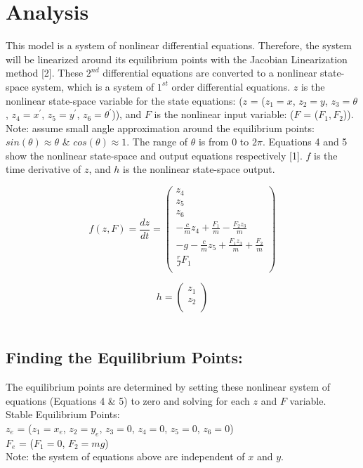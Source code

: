 \documentclass[conference]{IEEEtran}
\begin{document}
\newpage
\section{Analysis}
This model is a system of nonlinear differential equations. Therefore, the system will be linearized around its equilibrium points with the Jacobian Linearization method [2]. These $2^{nd}$ differential equations are converted to a nonlinear state-space system, which is a system of $1^{st}$  order differential equations. $z$ is the nonlinear state-space variable for the state equations: ($z$ = ($z_1 = x$, $z_2 = y$, $z_3 = \theta$, $z_4 = x^\prime$, $z_5 = y^\prime$, $z_6 = \theta^\prime$)), and $F$ is the nonlinear input variable: ($F$ = ($F_1,F_2$)).\\

Note: assume small angle approximation around the equilibrium points: $sin(\theta) \approx \theta$ \& $cos(\theta) \approx 1$. The range of $\theta$ is from 0 to $2\pi$. Equations 4 and 5 show the nonlinear state-space and output equations respectively [1]. $f$ is the time derivative of $z$, and $h$ is the nonlinear state-space output.

\[
f(z,F) = \frac{dz}{dt} =
\begin{pmatrix}
z_4\\
z_5\\
z_6 \\
-\frac{c}{m}z_4 + \frac{F_1}{m} -\frac{F_2z_3}{m}\\
-g - \frac{c}{m}z_5 + \frac{F_1z_3}{m} +\frac{F_2}{m}\\
\frac{r}{J}F_1\\
\end{pmatrix}  
\tag{4}
\]

\[
h = 
\begin{pmatrix}
z_1\\
z_2\\
\end{pmatrix}
\tag{5}
\]\\

\subsection{Finding the Equilibrium Points:}
The equilibrium points are determined by setting these nonlinear system of equations (Equations 4 \& 5) to zero and solving for each $z$ and $F$ variable. \\

\noindent Stable Equilibrium Points: \\
\indent $z_e$ = ($z_1 = x_e$, $z_2 = y_e$, $z_3 = 0$, $z_4 = 0$, $z_5 = 0$, $z_6 = 0$)\\
\indent $F_e$ = ($F_1 = 0$, $F_2 = mg$)\\
Note: the system of equations above are independent of $x$ and $y$. \\
\end{document}

